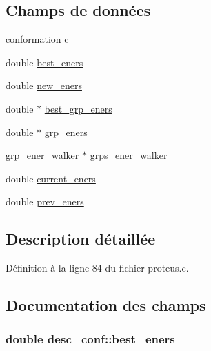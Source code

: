 \subsection*{Champs de données}
\begin{DoxyCompactItemize}
\item 
\hyperlink{structconformation}{conformation} \hyperlink{structdesc__conf_a3c0b7a75dae18ea3fda2eb4c20f99c97}{c}
\item 
double \hyperlink{structdesc__conf_a01c19f84e5ce8137b33648d81763e06b}{best\+\_\+eners}
\item 
double \hyperlink{structdesc__conf_a3d3be83590b54f443fbe4d2aecdf089a}{new\+\_\+eners}
\item 
double $\ast$ \hyperlink{structdesc__conf_ab33e8b3852770c2a02ec4c0f4aed7175}{best\+\_\+grp\+\_\+eners}
\item 
double $\ast$ \hyperlink{structdesc__conf_a51e46e1ff13876b1edb91e0b8de5218c}{grp\+\_\+eners}
\item 
\hyperlink{structgrp__ener__walker}{grp\+\_\+ener\+\_\+walker} $\ast$ \hyperlink{structdesc__conf_a316029c599dd209e1f35fff6d8591eba}{grps\+\_\+ener\+\_\+walker}
\item 
double \hyperlink{structdesc__conf_a3f02f26d6d7a76e22a958984d37d259d}{current\+\_\+eners}
\item 
double \hyperlink{structdesc__conf_ad2afd1ed51338c81a4689671fa4bc15b}{prev\+\_\+eners}
\end{DoxyCompactItemize}


\subsection{Description détaillée}


Définition à la ligne 84 du fichier proteus.\+c.



\subsection{Documentation des champs}
\hypertarget{structdesc__conf_a01c19f84e5ce8137b33648d81763e06b}{
\subsubsection[{best\+\_\+eners}]{\setlength{\rightskip}{0pt plus 5cm}double desc\+\_\+conf\+::best\+\_\+eners}}\label{structdesc__conf_a01c19f84e5ce8137b33648d81763e06b}


